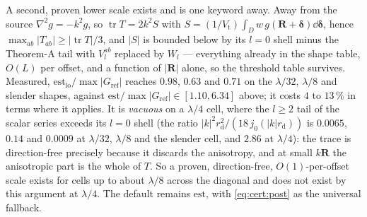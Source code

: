 A second, proven lower scale exists and is one keyword away. Away from the source
$\nabla^2 g = -k^2g$, so $\operatorname{tr}T = 2k^2 S$ with
$S = (1/V_{\mathrm{t}})\int_D w\,g(\mathbf{R}+\boldsymbol\delta)\dd\boldsymbol\delta$, hence
$\max_{ab}|T_{ab}| \ge |\operatorname{tr}T|/3$, and $|S|$ is bounded below by its $l = 0$
shell minus the Theorem-A tail with $V^{ab}_l$ replaced by $W_l$ --- everything already in
the shape table, $O(L)$ per offset, and a function of $|\mathbf{R}|$ alone, so the threshold
table survives. Measured, $\mathrm{est}_{\mathrm{lo}}/\max|G_{\mathrm{ref}}|$ reaches
$0.98$, $0.63$ and $0.71$ on the $\lambda/32$, $\lambda/8$ and slender shapes, against
$\mathrm{est}/\max|G_{\mathrm{ref}}| \in [1.10, 6.34]$ above; it costs $4$ to $13\,\%$ in
terms where it applies. It is \emph{vacuous} on a $\lambda/4$ cell, where the $l \ge 2$ tail
of the scalar series exceeds its $l = 0$ shell (the ratio
$|k|^2r_{\mathrm{d}}^2/(18\,j_0(|k|r_{\mathrm{d}}))$ is $0.0065$, $0.14$ and $0.0009$ at
$\lambda/32$, $\lambda/8$ and the slender cell, and $2.86$ at $\lambda/4$): the trace is
direction-free precisely because it discards the anisotropy, and at small $k\mathbf{R}$ the
anisotropic part is the whole of $T$. So a proven, direction-free, $O(1)$-per-offset scale
exists for cells up to about $\lambda/8$ across the diagonal and does not exist by this
argument at $\lambda/4$. The default remains $\mathrm{est}$, with
\eqref{eq:cert:post} as the universal fallback.
